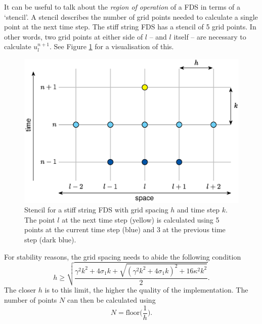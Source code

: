 \documentclass{article}
\begin{document}
It can be useful to talk about the \textit{region of operation} of a FDS in terms of a `stencil'. A stencil describes the number of grid points needed to calculate a single point at the next time step. The stiff string FDS has a stencil of 5 grid points. In other words, two grid points at either side of $l$ -- and $l$ itself -- are necessary to calculate $u^{n+1}_l$. See Figure \ref{fig:stencil1D} for a visualisation of this.
\begin{figure}[h]\includegraphics[width=1.0\columnwidth]{stencil1Dedit.eps}
\caption{Stencil for a stiff string FDS with grid spacing $h$ and time step $k$. The point $l$ at the next time step (yellow) is calculated using 5 points at the current time step (blue) and 3 at the previous time step (dark blue). \label{fig:stencil1D}}
\end{figure}

For stability reasons, the grid spacing needs to abide the following condition \cite{Bilbao2009:NumericalSoundSynthesis}
\begin{equation}\label{eq:stabilityString}
    h \geq \sqrt{\frac{\gamma^2 k^2 + 4 \sigma_1 k + \sqrt {(\gamma^2 k^2 + 4 \sigma_1 k)^2 + 16 \kappa^2 k^2}}{2}}.
\end{equation}
The closer $h$ is to this limit, the higher the quality of the implementation. The number of points $N$ can then be calculated using 
\begin{equation}\label{eq:NString}
    N = \text{floor}\bigg(\frac{1}{h}\bigg).
\end{equation}

\end{document}
